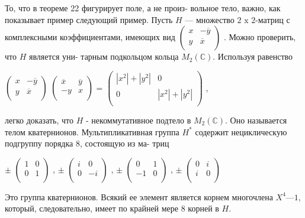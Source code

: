 \documentclass{../template/mai_book}
\begin{document}
\begin{mynotice}
То, что в теореме 22 фигурирует поле, а не произ-\linebreak
вольное тело, важно, как показывает пример следующий пример. Пусть\linebreak
$H$ --- множество $2\text{ x }2$-матриц с комплексными коэффициентами,\linebreak
\pagebreak
\linebreak 
\noindent имеющих вид $\begin{pmatrix}
	x & -\overline{y}\\
	y & \overline{x}\\
\end{pmatrix}$
. Можно проверить, что $H$ является уни-\linebreak
тарным подкольцом кольца $M_2(\mathbb{C})$. Используя равенство\\
\begin{center}
$\begin{pmatrix}
	x & -\overline{y}\\
	y & \overline{x}\\
\end{pmatrix}$
$\begin{pmatrix}
	\overline{x} & \overline{y}\\
	-y & x\\
\end{pmatrix}$
=
$\begin{pmatrix}
	|x^2| + |y^2| & 0\\
	0 & |x^2| + |y^2|\\
\end{pmatrix}$
,
\end{center}
легко доказать, что $H$ - некоммутативное подтело в $M_2(\mathbb{C})$. Оно \linebreak
называется телом кватернионов. Мультипликативная группа $H^*$\linebreak
содержит нециклическую подгруппу порядка 8, состоящую из ма­-\linebreak
триц
\begin{center}
$\pm$
$\begin{pmatrix}
	1 & 0\\
	0 & 1\\
\end{pmatrix}$
,
$\pm$
$\begin{pmatrix}
	i & 0\\
	0 & -i\\
\end{pmatrix}$
,
$\pm$
$\begin{pmatrix}
	0 & 1\\
	-1 & 0\\
\end{pmatrix}$
,
$\pm$
$\begin{pmatrix}
	0 & i\\
	i & 0\\
\end{pmatrix}$
\end{center}
Это группа кватернионов. Всякий ее элемент является корнем
многочлена $X^4 — 1$, который, следовательно, имеет по крайней
мере $8$ корней в $H$.
\end{mynotice}
\end{document}
